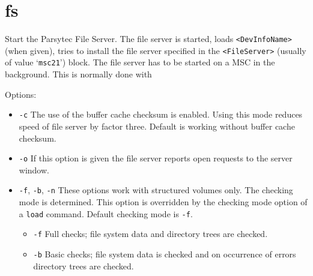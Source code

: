 \section{fs}
\begin{man}
  \PP Start the Parsytec File Server.
  \DE The file server is started, loads {\tt <DevInfoName>} (when given), tries
             to install the file server specified in the {\tt <FileServer>} (usually of
             value `{\tt msc21}') block. The file server has to be started on a MSC in the
             background. This is normally done with

             \bigskip
             \bigskip

             Options:
             \begin{itemize}

             \item {\tt -c}\newline
               The use of the buffer cache checksum is enabled. Using this mode
               reduces speed of file server by factor three.
	       Default is working without buffer cache checksum.

             \item {\tt -o}\newline
               If this option is given the file server reports open requests
               to the server window.

             \item {\tt -f}, {\tt -b}, {\tt -n}\newline
               These options work with structured volumes only.
	       The checking mode is determined. This option is overridden by 
               the checking mode option of a {\tt load} command. Default checking
               mode is {\tt -f}.

               \begin{itemize}

               \item {\tt -f}\newline
                 Full checks; file system data and directory trees are checked.

               \item {\tt -b}\newline
                 Basic checks; file system data is checked and on occurrence of
	         errors directory trees are checked.


\end{itemize}
\end{itemize}
\end{man}
